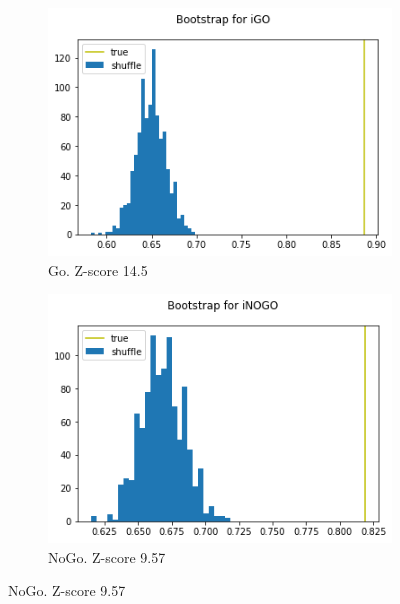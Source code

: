 \documentclass[a4paper,10pt]{article}
\begin{document}
\begin{figure}
    \centering
    \begin{subfigure}[b]{0.4\textwidth}
        \includegraphics[width=\textwidth]{img/marN_penny_noinput_A1_classifiability_go.png}
        \caption{Go. Z-score 14.5}
        \label{fig:marN_penny_noinput_A1_classifiability_go}
    \end{subfigure}\hspace{0.05\textwidth}
    \begin{subfigure}[b]{0.4\textwidth}
        \includegraphics[width=\textwidth]{img/marN_penny_noinput_A1_classifiability_nogo.png}
        \caption{NoGo. Z-score 9.57}
        \label{fig:marN_penny_noinput_A1_classifiability_nogo}
    \end{subfigure}

\end{figure}
\end{document}
